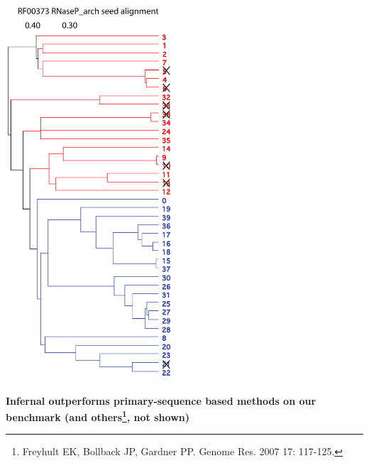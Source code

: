 \documentclass[landscape]{slides}
\begin{document}
\begin{slide}
\begin{minipage}{3.5in}
\begin{center}
\includegraphics[height=5.5in]{figs/u8-RF00373-tree}

\end{center}
\end{minipage}
\end{slide}
\begin{slide}
\begin{center}

\textbf{Infernal outperforms primary-sequence based methods on our
  benchmark (and others\footnote{Freyhult EK, Bollback JP, Gardner
    PP. Genome Res. 2007 17: 117-125.}, not shown)}

\end{center}
\medskip


\vfill 
\end{slide}
\end{document}
